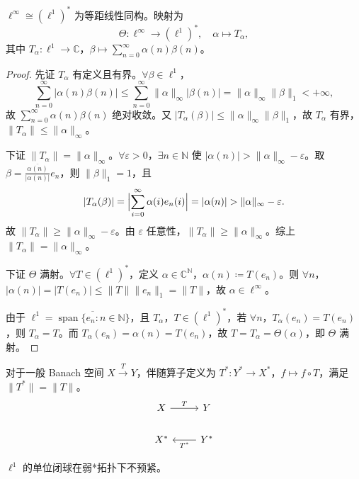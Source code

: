 \documentclass[lang=cn,a4paper,newtx,section]{elegantbook}
\begin{document}
\begin{theorem}
  $\ell^\infty\cong(\ell^1)^*$ 为等距线性同构。映射为
  \[
    \Theta:\ell^\infty\to(\ell^1)^*,\quad\alpha\mapsto T_\alpha,
  \]
  其中 $T_\alpha:\ell^1\to\mathbb{C}$，$\beta\mapsto\sum_{n=0}^{\infty}\alpha(n)\beta(n)$。
\end{theorem}

\begin{proof}
  先证 $T_\alpha$ 有定义且有界。$\forall\beta\in\ell^1$，
  \[
    \sum_{n=0}^{\infty}|\alpha(n)\beta(n)|\leq\sum_{n=0}^{\infty}\|\alpha\|_\infty|\beta(n)|=\|\alpha\|_\infty\|\beta\|_1<+\infty,
  \]
  故 $\sum_{n=0}^{\infty}\alpha(n)\beta(n)$ 绝对收敛。又 $|T_\alpha(\beta)|\leq\|\alpha\|_\infty\|\beta\|_1$，故 $T_\alpha$ 有界，$\|T_\alpha\|\leq\|\alpha\|_\infty$。

  下证 $\|T_\alpha\|=\|\alpha\|_\infty$。$\forall\varepsilon>0$，$\exists n\in\mathbb{N}$ 使 $|\alpha(n)|>\|\alpha\|_\infty-\varepsilon$。取 $\beta=\frac{\overline{\alpha(n)}}{|\alpha(n)|}e_n$，则 $\|\beta\|_1=1$，且
  \[
    |T_\alpha(\beta)|=\Bigl|\sum_{i=0}^{\infty}\alpha(i)e_n(i)\Bigr|=|\alpha(n)|>\|\alpha\|_\infty-\varepsilon.
  \]
  故 $\|T_\alpha\|\geq\|\alpha\|_\infty-\varepsilon$。由 $\varepsilon$ 任意性，$\|T_\alpha\|\geq\|\alpha\|_\infty$。综上 $\|T_\alpha\|=\|\alpha\|_\infty$。

  下证 $\Theta$ 满射。$\forall T\in(\ell^1)^*$，定义 $\alpha\in\mathbb{C}^{\mathbb{N}}$，$\alpha(n)\coloneqq T(e_n)$。则 $\forall n$，$|\alpha(n)|=|T(e_n)|\leq\|T\|\|e_n\|_1=\|T\|$，故 $\alpha\in\ell^\infty$。

  由于 $\ell^1=\overline{\operatorname{span}\{e_n:n\in\mathbb{N}\}}$，且 $T_\alpha$，$T\in(\ell^1)^*$，若 $\forall n$，$T_\alpha(e_n)=T(e_n)$，则 $T_\alpha=T$。而 $T_\alpha(e_n)=\alpha(n)=T(e_n)$，故 $T=T_\alpha=\Theta(\alpha)$，即 $\Theta$ 满射。
\end{proof}

\begin{remark}
  对于一般 Banach 空间 $X\xrightarrow{T}Y$，伴随算子定义为 $T^*:Y^*\to X^*$，$f\mapsto f\circ T$，满足 $\|T^*\|=\|T\|$。
  \[
    \begin{tikzcd}
      X \arrow[r,"T"] & Y \\
      X^* & Y^* \arrow[l,"T^*"]
    \end{tikzcd}
  \]
\end{remark}

\begin{proposition}
  $\ell^1$ 的单位闭球在弱*拓扑下不预紧。
\end{proposition}
\end{document}
